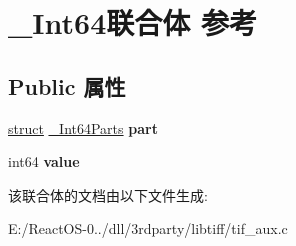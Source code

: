 \hypertarget{union___int64}{}\section{\+\_\+\+Int64联合体 参考}
\label{union___int64}
\subsection*{Public 属性}
\begin{DoxyCompactItemize}
\item 
\mbox{\label{union___int64_ad63b8e8802eef6dcf1653ee764e110c1}} 
\hyperlink{interfacestruct}{struct} \hyperlink{struct___int64_parts}{\+\_\+\+Int64\+Parts} {\bfseries part}
\item 
\mbox{\label{union___int64_a068c9d5f7db8836d3a4eb7ddba324f1d}} 
int64 {\bfseries value}
\end{DoxyCompactItemize}


该联合体的文档由以下文件生成\+:\begin{DoxyCompactItemize}
\item 
E\+:/\+React\+O\+S-\/0../dll/3rdparty/libtiff/tif\+\_\+aux.\+c\end{DoxyCompactItemize}

